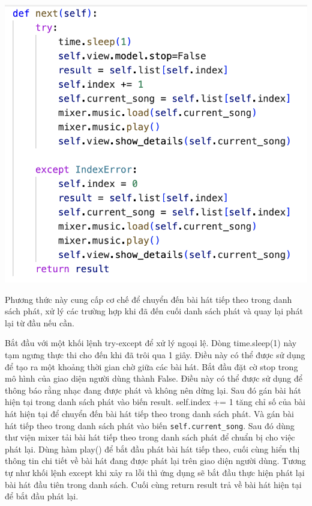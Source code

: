 \documentclass[a4paper]{article}
\begin{document}
\begin{center}
\includegraphics[width=1\linewidth]{template_SGU 2/Playlist_next.png}
\end{center}

\hspace*{0.5cm} Phương thức này cung cấp cơ chế để chuyển đến bài hát tiếp theo trong danh sách phát, xử lý các trường hợp khi đã đến cuối danh sách phát và quay lại phát lại từ đầu nếu cần.

\hspace*{0.5cm} Bắt đầu với một khối lệnh try-except để xử lý ngoại lệ. Dòng time.sleep(1) này tạm ngưng thực thi cho đến khi đã trôi qua 1 giây. Điều này có thể được sử dụng để tạo ra một khoảng thời gian chờ giữa các bài hát. Bắt đầu đặt cờ stop trong mô hình của giao diện người dùng thành False. Điều này có thể được sử dụng để thông báo rằng nhạc đang được phát và không nên dừng lại. Sau đó gán bài hát hiện tại trong danh sách phát vào biến result. self.index += 1 tăng chỉ số của bài hát hiện tại để chuyển đến bài hát tiếp theo trong danh sách phát. Và gán bài hát tiếp theo trong danh sách phát vào biến \texttt{self.current\_song}. Sau đó dùng thư viện mixer tải bài hát tiếp theo trong danh sách phát để chuẩn bị cho việc phát lại. Dùng hàm play() để bắt đầu phát bài hát tiếp theo, cuối cùng hiển thị thông tin chi tiết về bài hát đang được phát lại trên giao diện người dùng. Tương tự như khối lệnh except khi xảy ra lỗi thì ứng dụng sẽ bắt đầu thực hiện phát lại bài hát đầu tiên trong danh sách. Cuối cùng return result trả về bài hát hiện tại để bắt đầu phát lại.
\end{document}
